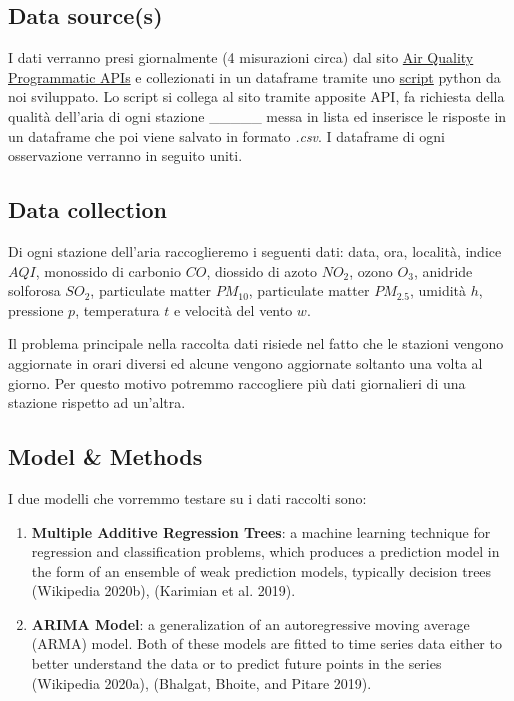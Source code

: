 \documentclass[
  12pt,
]{article}
\begin{document}
\hypertarget{data-sources}{%
\subsection{Data source(s)}\label{data-sources}}

I dati verranno presi giornalmente (4 misurazioni circa) dal sito
\href{https://aqicn.org/api/}{Air Quality Programmatic APIs} e
collezionati in un dataframe tramite uno
\href{https://github.com/ceccaroni1884368/SL_Project}{script} python da
noi sviluppato. Lo script si collega al sito tramite apposite API, fa
richiesta della qualità dell'aria di ogni stazione \_\_\_\_\_ messa in
lista ed inserisce le risposte in un dataframe che poi viene salvato in
formato \textit{.csv}. I dataframe di ogni osservazione verranno in
seguito uniti.

\hypertarget{data-collection}{%
\subsection{Data collection}\label{data-collection}}

Di ogni stazione dell'aria raccoglieremo i seguenti dati: data, ora,
località, indice \(AQI\), monossido di carbonio \(CO\), diossido di
azoto \(NO_2\), ozono \(O_3\), anidride solforosa \(SO_2\), particulate
matter \(PM_{10}\), particulate matter \(PM_{2.5}\), umidità \(h\),
pressione \(p\), temperatura \(t\) e velocità del vento \(w\).

Il problema principale nella raccolta dati risiede nel fatto che le
stazioni vengono aggiornate in orari diversi ed alcune vengono
aggiornate soltanto una volta al giorno. Per questo motivo potremmo
raccogliere più dati giornalieri di una stazione rispetto ad un'altra.

\hypertarget{model-methods}{%
\subsection{Model \& Methods}\label{model-methods}}

I due modelli che vorremmo testare su i dati raccolti sono:

\begin{enumerate}
\def\labelenumi{\arabic{enumi}.}
\item
  \textbf{Multiple Additive Regression Trees}: a machine learning
  technique for regression and classification problems, which produces a
  prediction model in the form of an ensemble of weak prediction models,
  typically decision trees (Wikipedia 2020b), (Karimian et al. 2019).
\item
  \textbf{ARIMA Model}: a generalization of an autoregressive moving
  average (ARMA) model. Both of these models are fitted to time series
  data either to better understand the data or to predict future points
  in the series (Wikipedia 2020a), (Bhalgat, Bhoite, and Pitare 2019).
\end{enumerate}
\end{document}
